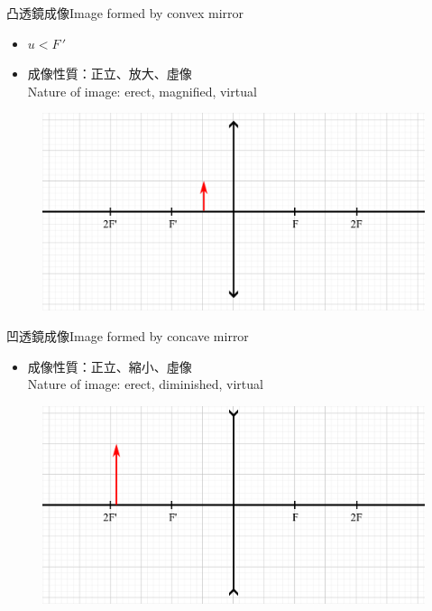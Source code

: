 \documentclass[beamer=true]{standalone}
\begin{document}
\begin{frame}{凸透鏡成像Image formed by convex mirror}
    \begin{itemize}
        \item $u<F\,'$
        \item 成像性質：正立、放大、虛像
              \\Nature of image: erect, magnified, virtual
    \end{itemize}
    \begin{figure}
        \centering
        \includegraphics[width=1\linewidth]{assets/dqiwdwq09dwqe.png}


    \end{figure}
\end{frame}


\begin{frame}{凹透鏡成像Image formed by concave mirror}
    \begin{itemize}
        \item 成像性質：正立、縮小、虛像
              \\Nature of image: erect, diminished, virtual
    \end{itemize}
    \begin{figure}
        \centering
        \includegraphics[width=1\linewidth]{assets/dqdnq90wdwq.png}


    \end{figure}
\end{frame}
\end{document}
